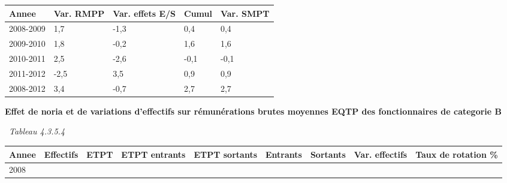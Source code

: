 \begin{longtable}[]{@{}lllll@{}}
\toprule
Annee & Var. RMPP & Var. effets E/S & Cumul & Var. SMPT\tabularnewline
\midrule
\endhead
2008-2009 & 1,7 & -1,3 & 0,4 & 0,4\tabularnewline
2009-2010 & 1,8 & -0,2 & 1,6 & 1,6\tabularnewline
2010-2011 & 2,5 & -2,6 & -0,1 & -0,1\tabularnewline
2011-2012 & -2,5 & 3,5 & 0,9 & 0,9\tabularnewline
2008-2012 & 3,4 & -0,7 & 2,7 & 2,7\tabularnewline
\bottomrule
\end{longtable}

\textbf{Effet de noria et de variations d'effectifs sur rémunérations
brutes moyennes EQTP des fonctionnaires de categorie B}

~\emph{Tableau 4.3.5.4}

\begin{longtable}[]{@{}lllllllll@{}}
\toprule
\begin{minipage}[b]{0.05\columnwidth}\raggedright
Annee\strut
\end{minipage} & \begin{minipage}[b]{0.08\columnwidth}\raggedright
Effectifs\strut
\end{minipage} & \begin{minipage}[b]{0.05\columnwidth}\raggedright
ETPT\strut
\end{minipage} & \begin{minipage}[b]{0.10\columnwidth}\raggedright
ETPT entrants\strut
\end{minipage} & \begin{minipage}[b]{0.10\columnwidth}\raggedright
ETPT sortants\strut
\end{minipage} & \begin{minipage}[b]{0.07\columnwidth}\raggedright
Entrants\strut
\end{minipage} & \begin{minipage}[b]{0.07\columnwidth}\raggedright
Sortants\strut
\end{minipage} & \begin{minipage}[b]{0.11\columnwidth}\raggedright
Var. effectifs\strut
\end{minipage} & \begin{minipage}[b]{0.14\columnwidth}\raggedright
Taux de rotation \%\strut
\end{minipage}\tabularnewline
\midrule
\endhead
\begin{minipage}[t]{0.05\columnwidth}\raggedright
2008\strut
\end{minipage} & \begin{minipage}[t]{0.08\columnwidth}\raggedright

\end{minipage}
\end{longtable}

